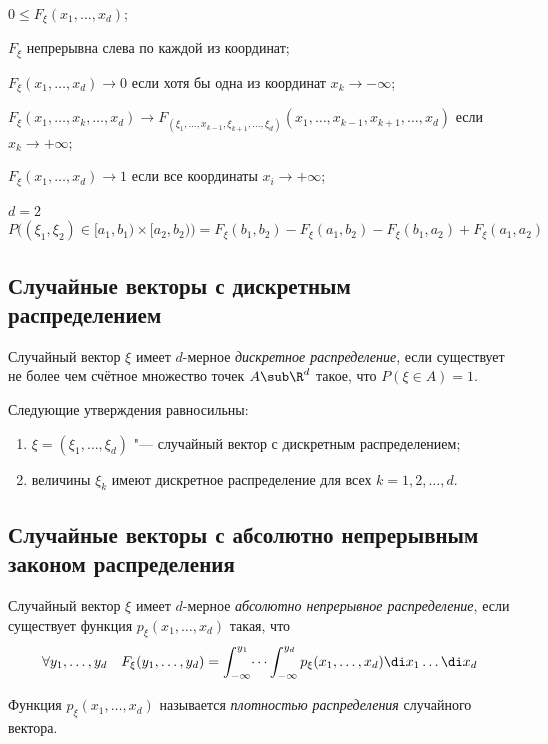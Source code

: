 \begin{props}
\item $ 0 \le F_\xi(x_1, \dots, x_d) $;
\item $ F_\xi $ непрерывна слева по каждой из координат;
\item $ F_\xi(x_1, \dots, x_d) \to 0 $ если хотя бы одна из координат $ x_k \to -\infty $;
\item $ F_\xi(x_1, \dots, x_k, \dots, x_d) \to
	F_{(\xi_1, \dots, x_{k - 1}, \xi_{k + 1}, \dots, \xi_d)}
	(x_1, \dots, x_{k - 1}, x_{k + 1}, \dots, x_d) $ если $ x_k \to +\infty $;
\item $ F_\xi(x_1, \dots, x_d) \to 1 $ если все координаты $ x_i \to +\infty $;
\item $ d = 2 $
	$$ P \bigl( (\xi_1, \xi_2) \in [a_1, b_1) \times [a_2, b_2) \bigr) =
	F_\xi(b_1, b_2) - F_\xi(a_1, b_2) - F_\xi(b_1, a_2) + F_\xi(a_1, a_2) $$
\end{props}

\subsection{Случайные векторы с дискретным распределением}

\begin{definition}
	Случайный вектор $ \xi $ имеет $ d $-мерное \emph{дискретное распределение}, если существует не
	более чем счётное множество точек $ A \sub \R^d $ такое, что $ P(\xi \in A) = 1 $.
\end{definition}

\begin{statement}
	Следующие утверждения равносильны:
	\begin{enumerate}
		\item $ \xi = (\xi_1, \dots, \xi_d) $ "--- случайный вектор с дискретным распределением;
		\item величины $ \xi_k $ имеют дискретное распределение для всех $ k = 1, 2, \dots, d $.
	\end{enumerate}
\end{statement}

\subsection{Случайные векторы с абсолютно непрерывным законом распределения}

\begin{definition}
	Случайный вектор $ \xi $ имеет $ d $-мерное \emph{абсолютно непрерывное распределение}, если
	существует функция $ p_\xi(x_1, \dots, x_d) $ такая, что
	$$ \forall y_1, \dots, y_d \quad F_\xi(y_1, \dots, y_d) = \int_{-\infty}^{y_1} \dots
	\int_{-\infty}^{y_d} p_\xi(x_1, \dots, x_d) \di x_1 \dots \di x_d $$

	Функция $ p_\xi(x_1, \dots, x_d) $ называется \emph{плотностью распределения} случайного
	вектора.
\end{definition}

